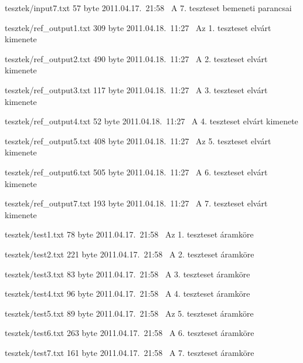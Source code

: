\begin{fajllista}
\fajl
{tesztek/input7.txt} %
{57 byte} %
{2011.04.17.~21:58~} %
{A 7. teszteset bemeneti parancsai} %

\fajl
{tesztek/ref\_output1.txt} %
{309 byte} %
{2011.04.18.~11:27~} %
{Az 1. teszteset elvárt kimenete} %

\fajl
{tesztek/ref\_output2.txt} %
{490 byte} %
{2011.04.18.~11:27~} %
{A 2. teszteset elvárt kimenete} %

\fajl
{tesztek/ref\_output3.txt} %
{117 byte} %
{2011.04.18.~11:27~} %
{A 3. teszteset elvárt kimenete} %

\fajl
{tesztek/ref\_output4.txt} %
{52 byte} %
{2011.04.18.~11:27~} %
{A 4. teszteset elvárt kimenete} %

\fajl
{tesztek/ref\_output5.txt} %
{408 byte} %
{2011.04.18.~11:27~} %
{Az 5. teszteset elvárt kimenete} %

\fajl
{tesztek/ref\_output6.txt} %
{505 byte} %
{2011.04.18.~11:27~} %
{A 6. teszteset elvárt kimenete} %

\fajl
{tesztek/ref\_output7.txt} %
{193 byte} %
{2011.04.18.~11:27~} %
{A 7. teszteset elvárt kimenete} %

\fajl
{tesztek/test1.txt} %
{78 byte} %
{2011.04.17.~21:58~} %
{Az 1. teszteset áramköre} %

\fajl
{tesztek/test2.txt} %
{221 byte} %
{2011.04.17.~21:58~} %
{A 2. teszteset áramköre} %

\fajl
{tesztek/test3.txt} %
{83 byte} %
{2011.04.17.~21:58~} %
{A 3. teszteset áramköre} %

\fajl
{tesztek/test4.txt} %
{96 byte} %
{2011.04.17.~21:58~} %
{A 4. teszteset áramköre} %

\fajl
{tesztek/test5.txt} %
{89 byte} %
{2011.04.17.~21:58~} %
{Az 5. teszteset áramköre} %

\fajl
{tesztek/test6.txt} %
{263 byte} %
{2011.04.17.~21:58~} %
{A 6. teszteset áramköre} %

\fajl
{tesztek/test7.txt} %
{161 byte} %
{2011.04.17.~21:58~} %
{A 7. teszteset áramköre} %

\end{fajllista}

